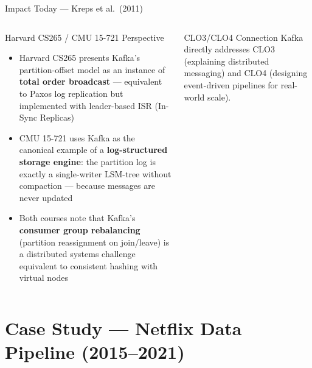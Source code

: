 \documentclass[aspectratio=169,10pt]{beamer}
\begin{document}
\begin{frame}{Impact Today — Kreps et al.\ (2011)}
\begin{columns}[T]
      \begin{exampleblock}{Harvard CS265 / CMU 15-721 Perspective}
        \begin{itemize}
          \item Harvard CS265 presents Kafka's partition-offset model
                as an instance of \textbf{total order broadcast} —
                equivalent to Paxos log replication but implemented
                with leader-based ISR (In-Sync Replicas)
          \item CMU 15-721 uses Kafka as the canonical example of a
                \textbf{log-structured storage engine}:
                the partition log is exactly a single-writer LSM-tree
                without compaction — because messages are never updated
          \item Both courses note that Kafka's \textbf{consumer group
                rebalancing} (partition reassignment on join/leave)
                is a distributed systems challenge equivalent to
                consistent hashing with virtual nodes
        \end{itemize}
      \end{exampleblock}
      \vspace{4pt}
      \begin{alertblock}{CLO3/CLO4 Connection}
        Kafka directly addresses CLO3 (explaining distributed messaging)
        and CLO4 (designing event-driven pipelines for real-world scale).
      \end{alertblock}
  \end{columns}
\end{frame}

\section{Case Study — Netflix Data Pipeline (2015--2021)}
\end{document}
